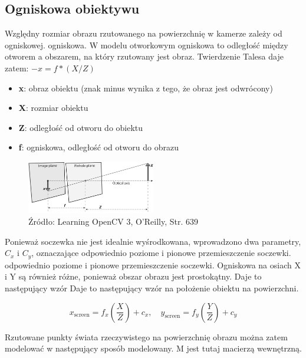 \documentclass[magisterska]{pracadypl}
\begin{document}
\subsection{Ogniskowa obiektywu}

Względny rozmiar obrazu rzutowanego na powierzchnię w kamerze zależy od ogniskowej.
ogniskowa. W modelu otworkowym ogniskowa to odległość między otworem
a obszarem, na który rzutowany jest obraz.
Twierdzenie Talesa daje zatem: $-x = f * (X / Z)$

\begin{itemize}
  \item \textbf{x}: obraz obiektu (znak minus wynika z tego, że obraz jest odwrócony)
  \item \textbf{X}: rozmiar obiektu
  \item \textbf{Z}: odległość od otworu do obiektu
  \item \textbf{f}: ogniskowa, odległość od otworu do obrazu
\end{itemize}

\begin{figure}[h]  %
    \centering  %
    \includegraphics[width=0.5\textwidth]{images/pinhole.png}  %
    \captionsetup{labelformat=empty, font=footnotesize}
    \caption{Źródło: Learning OpenCV 3, O'Reilly, Str. 639}
    \label{fig:rpi}  %
\end{figure}

Ponieważ soczewka nie jest idealnie wyśrodkowana, wprowadzono dwa parametry, $C_x$ i $C_y$, oznaczające odpowiednio poziome i pionowe przemieszczenie soczewki.
odpowiednio poziome i pionowe przemieszczenie soczewki. Ogniskowa na osiach X i
Y są również różne, ponieważ obszar obrazu jest prostokątny. Daje to następujący wzór
Daje to następujący wzór na położenie obiektu na powierzchni.

\[
x_{\text{screen}} = f_x \left( \frac{X}{Z} \right) + c_x, \quad
y_{\text{screen}} = f_y \left( \frac{Y}{Z} \right) + c_y
\]

Rzutowane punkty świata rzeczywistego na powierzchnię obrazu można zatem modelować w następujący sposób
modelowany. M jest tutaj macierzą wewnętrzną.
\end{document}
